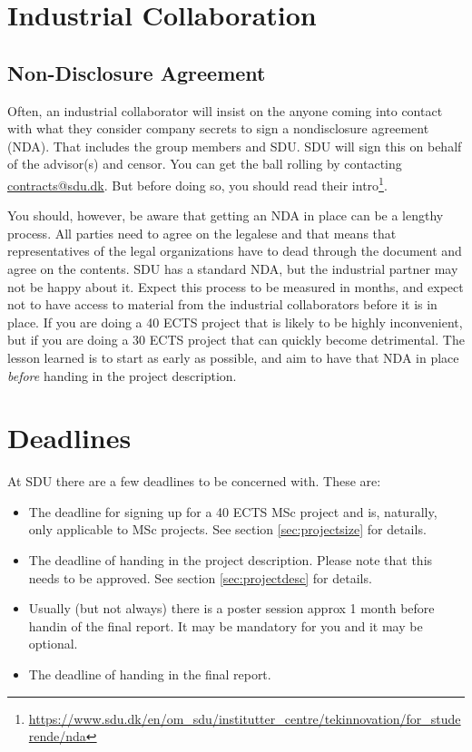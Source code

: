 \documentclass[a4paper, oneside]{memoir}
\newcommand{\idx}[1]{\index{#1}\marginpar{\raggedright \tiny #1}}
\newcommand{\idxx}[2]{\index{#1}\marginpar{\raggedright \tiny #2}}
\begin{document}
\section{Industrial Collaboration}




\subsection{Non-Disclosure Agreement}

\idxx{NDA}{NDA} Often, an industrial collaborator will insist on the anyone coming into contact with what they consider company secrets to sign a nondisclosure agreement (NDA). That includes the group members and SDU. SDU will sign this on behalf of the advisor(s) and censor. You can get the ball rolling by contacting \href{mailto:contracts@sdu.dk}{contracts@sdu.dk}. But before doing so, you should read their intro\footnote{\url{https://www.sdu.dk/en/om_sdu/institutter_centre/tekinnovation/for_studerende/nda}}.

You should, however, be aware that getting an NDA in place can be a lengthy process. All parties need to agree on the legalese and that means that representatives of the legal organizations have to dead through the document and agree on the contents. SDU has a standard NDA, but the industrial partner may not be happy about it. Expect this process to be measured in months, and expect not to have access to material from the industrial collaborators before it is in place. If you are doing a 40 ECTS project that is likely to be highly inconvenient, but if you are doing a 30 ECTS project that can quickly become detrimental. The lesson learned is to start as early as possible, and aim to have that NDA in place \textsl{before} handing in the project description.

\section{Deadlines}

\idx{Deadlines} At SDU there are a few deadlines to be concerned with. These are:
\begin{itemize}
  \item The deadline for signing up for a 40 ECTS MSc project and is, naturally, only applicable to MSc projects. See section \ref{sec:projectsize} for details.
  \item The deadline of handing in the project description. Please note that this needs to be approved. See section \ref{sec:projectdesc} for details.
  \item Usually (but not always) there is a poster session approx 1 month before handin of the final report. It may be mandatory for you and it may be optional.
  \item The deadline of handing in the final report.
\end{itemize}
\end{document}
